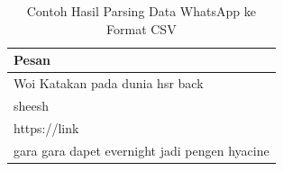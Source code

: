 \begingroup
\pagestyle{fancy}
\renewcommand{\arraystretch}{1}
\begin{table}[H]
\centering
\caption{Contoh Hasil Parsing Data WhatsApp ke Format CSV}
\label{tab:contoh-hasil-parsing}
\scriptsize
\begin{tabular}{p{12cm}}
\toprule
\textbf{Pesan} \\
\midrule
Woi Katakan pada dunia hsr back \\
sheesh \\
https://link \\
gara gara dapet evernight jadi pengen hyacine \\
\bottomrule
\end{tabular}
\end{table}
\endgroup